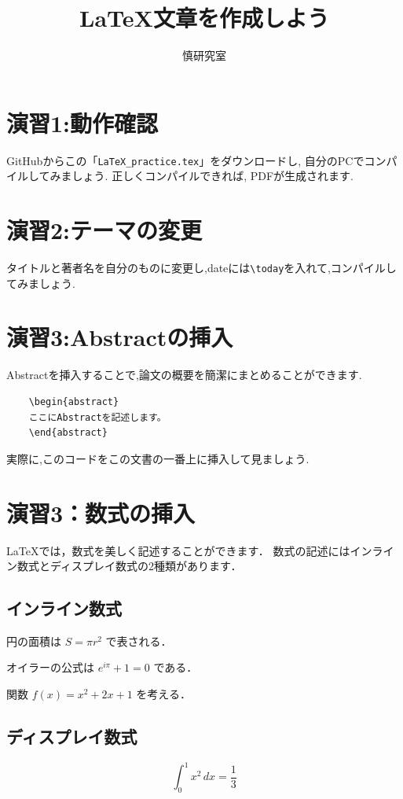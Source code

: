 \documentclass[a4paper,twocolumn]{jsarticle}
\title{
LaTeX文章を作成しよう
}
\author{慎研究室}
\date{}
\begin{document}
\maketitle  %

\section*{演習1:動作確認}
GitHubからこの「\texttt{LaTeX\_practice.tex}」をダウンロードし,
自分のPCでコンパイルしてみましょう.
正しくコンパイルできれば, PDFが生成されます.
\section*{演習2:テーマの変更}
タイトルと著者名を自分のものに変更し,dateには\verb|\today|を入れて,コンパイルしてみましょう.\\
\section*{演習3:Abstractの挿入}
Abstractを挿入することで,論文の概要を簡潔にまとめることができます.
\begin{verbatim}
    \begin{abstract}
    ここにAbstractを記述します。
    \end{abstract}
\end{verbatim}
実際に,このコードをこの文書の一番上に挿入して見ましょう.
\section*{演習3：数式の挿入}
LaTeXでは，数式を美しく記述することができます．
数式の記述にはインライン数式とディスプレイ数式の2種類があります．
\subsection*{インライン数式}
円の面積は $S=\pi r^2$ で表される．

オイラーの公式は $e^{i\pi}+1=0$ である．

関数 $f(x)=x^2+2x+1$ を考える．
\subsection*{ディスプレイ数式}
\begin{equation}
\int_{0}^{1} x^2\,dx=\frac{1}{3}
\label{eq:integral}
\end{equation}
\end{document}
